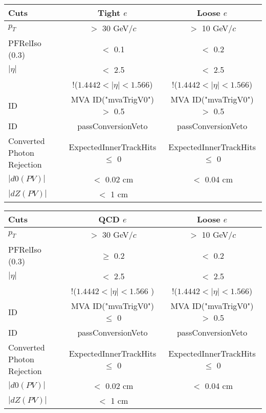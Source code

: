 \documentclass[landscape]{article}
\begin{document}
\begin{small}
  
  \begin{center}

    \begin{tabular}{ | l | c | c | }
      \hline \hline
      Cuts & Tight $e$ & Loose $e$ \\ \hline
      $p_{T}$ & $>$ 30 GeV/$c$ & $>$ 10 GeV/$c$ \\ \hline
      PFRelIso (0.3) & $<$ 0.1 & $<$ 0.2 \\ \hline
      $|\eta|$ & $<$ 2.5 & $<$ 2.5 \\
       & !($1.4442 < |\eta| < 1.566$) & !($1.4442 < |\eta| < 1.566$) \\ \hline
      ID & MVA ID("mvaTrigV0") $>$ 0.5 & MVA ID("mvaTrigV0") $>$ 0.5 \\ \hline
      ID & passConversionVeto & passConversionVeto \\ \hline
      Converted Photon Rejection & ExpectedInnerTrackHits $\leq$ 0 & ExpectedInnerTrackHits $\leq$ 0 \\ \hline
      $|d0(PV)|$ & $<$ 0.02 cm & $<$ 0.04 cm \\ \hline
      $|dZ(PV)|$ & $<$ 1 cm & \\
      \hline \hline
    \end{tabular}

    \vspace{10 mm}

    \begin{tabular}{ | l | c | c | }
      \hline \hline
      Cuts & QCD $e$ & Loose $e$ \\ \hline
      $p_{T}$ & $>$ 30 GeV/$c$ & $>$ 10 GeV/$c$ \\ \hline
      PFRelIso (0.3) & $\geq$ 0.2 & $<$ 0.2 \\ \hline
      $|\eta|$ & $<$ 2.5 & $<$ 2.5 \\
       & !($1.4442 < |\eta| < 1.566$ ) & !($1.4442 < |\eta| < 1.566$) \\ \hline
      ID & MVA ID("mvaTrigV0") $\leq$ 0 & MVA ID("mvaTrigV0") $>$ 0.5 \\ \hline
      ID & passConversionVeto & passConversionVeto \\ \hline
      Converted Photon Rejection & ExpectedInnerTrackHits $\leq$ 0 & ExpectedInnerTrackHits $\leq$ 0 \\ \hline
      $|d0(PV)|$ & $<$ 0.02 cm & $<$ 0.04 cm \\ \hline
      $|dZ(PV)|$ & $<$ 1 cm & \\
      \hline \hline
    \end{tabular}


\end{center}
\end{small}
\end{document}
